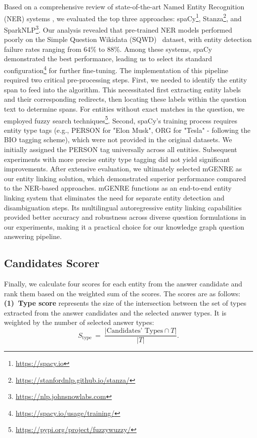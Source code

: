 Based on a comprehensive review of state-of-the-art Named Entity Recognition (NER) systems \cite{vajjala-balasubramaniam-2022-really}, we evaluated the top three approaches: spaCy\footnote{\url{https://spacy.io}}, Stanza\footnote{\url{https://stanfordnlp.github.io/stanza/}}, and SparkNLP\footnote{\url{https://nlp.johnsnowlabs.com}}. Our analysis revealed that pre-trained NER models performed poorly on the Simple Question Wikidata (SQWD)~\cite{SQ_WD} dataset, with entity detection failure rates ranging from 64\% to 88\%. Among these systems, spaCy demonstrated the best performance, leading us to select its standard configuration\footnote{\url{https://spacy.io/usage/training/}} for further fine-tuning. The implementation of this pipeline required two critical pre-processing steps. First, we needed to identify the entity span to feed into the algorithm. This necessitated first extracting entity labels and their corresponding redirects, then locating these labels within the question text to determine spans. For entities without exact matches in the question, we employed fuzzy search techniques\footnote{\url{https://pypi.org/project/fuzzywuzzy/}}. Second, spaCy's training process requires entity type tags (e.g., PERSON for "Elon Musk", ORG for "Tesla" - following the BIO tagging scheme), which were not provided in the original datasets. We initially assigned the PERSON tag universally across all entities. Subsequent experiments with more precise entity type tagging did not yield significant improvements.
After extensive evaluation, we ultimately selected mGENRE \cite{decao2021multilingual} as our entity linking solution, which demonstrated superior performance compared to the NER-based approaches. mGENRE functions as an end-to-end entity linking system that eliminates the need for separate entity detection and disambiguation steps. Its multilingual autoregressive entity linking capabilities provided better accuracy and robustness across diverse question formulations in our experiments, making it a practical choice for our knowledge graph question answering pipeline.

\subsection{Candidates Scorer}
Finally, we calculate four scores for each entity from the answer candidate and rank them based on the weighted sum of the scores.
The scores are as follows:
    \textbf{(1)~Type score} represents the size of the intersection between the set of types extracted from the answer candidates and the selected answer types. It is weighted by the number of selected answer types: $$S_\textrm{type}~=~\frac{|\textrm{Candidates' Types} \cap T|}{|T|}.$$

